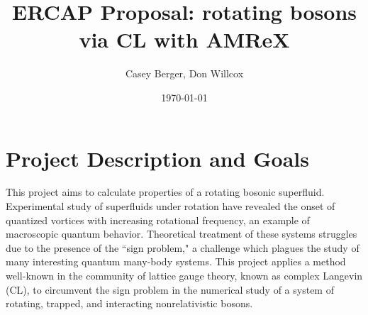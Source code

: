 \documentclass[onecolumn, 12pt]{article}
\title{ERCAP Proposal: rotating bosons via CL with AMReX}
\author{Casey Berger, Don Willcox}
\date{\today}
\begin{document}
\section{Project Description and Goals}
	
	
	

	

	
This project aims to calculate properties of a rotating bosonic superfluid. Experimental study of superfluids under rotation have revealed the onset of quantized vortices with increasing rotational frequency, an example of macroscopic quantum behavior. Theoretical treatment of these systems struggles due to the presence of the ``sign problem," a challenge which plagues the study of many interesting quantum many-body systems. This project applies a method well-known in the community of lattice gauge theory, known as complex Langevin (CL), to circumvent the sign problem in the numerical study of a system of rotating, trapped, and interacting nonrelativistic bosons. 
\end{document}
